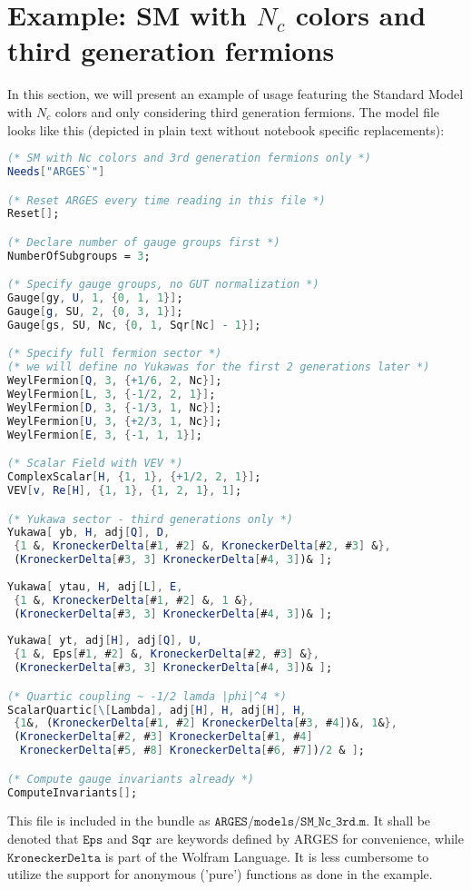 \documentclass{scrartcl}
\begin{document}
\section{Example: SM with $N_c$ colors and third generation fermions}
In this section, we will present an example of usage featuring the Standard Model with $N_c$ colors and only considering third generation fermions. The model file looks like this (depicted in plain text without notebook specific replacements):
\begin{lstlisting}[language=mathematica,mathescape,columns=flexible,backgroundcolor=\color{light-gray}]
(* SM with Nc colors and 3rd generation fermions only *)
Needs["ARGES`"]

(* Reset ARGES every time reading in this file *)
Reset[];

(* Declare number of gauge groups first *)
NumberOfSubgroups = 3;

(* Specify gauge groups, no GUT normalization *)
Gauge[gy, U, 1, {0, 1, 1}];
Gauge[g, SU, 2, {0, 3, 1}];
Gauge[gs, SU, Nc, {0, 1, Sqr[Nc] - 1}];

(* Specify full fermion sector *)
(* we will define no Yukawas for the first 2 generations later *)
WeylFermion[Q, 3, {+1/6, 2, Nc}];
WeylFermion[L, 3, {-1/2, 2, 1}];
WeylFermion[D, 3, {-1/3, 1, Nc}];
WeylFermion[U, 3, {+2/3, 1, Nc}];
WeylFermion[E, 3, {-1, 1, 1}];

(* Scalar Field with VEV *)
ComplexScalar[H, {1, 1}, {+1/2, 2, 1}];
VEV[v, Re[H], {1, 1}, {1, 2, 1}, 1];

(* Yukawa sector - third generations only *)
Yukawa[ yb, H, adj[Q], D, 
 {1 &, KroneckerDelta[#1, #2] &, KroneckerDelta[#2, #3] &}, 
 (KroneckerDelta[#3, 3] KroneckerDelta[#4, 3])& ];
 
Yukawa[ ytau, H, adj[L], E, 
 {1 &, KroneckerDelta[#1, #2] &, 1 &}, 
 (KroneckerDelta[#3, 3] KroneckerDelta[#4, 3])& ];
 
Yukawa[ yt, adj[H], adj[Q], U, 
 {1 &, Eps[#1, #2] &, KroneckerDelta[#2, #3] &},
 (KroneckerDelta[#3, 3] KroneckerDelta[#4, 3])& ];

(* Quartic coupling ~ -1/2 lamda |phi|^4 *)
ScalarQuartic[\[Lambda], adj[H], H, adj[H], H, 
 {1&, (KroneckerDelta[#1, #2] KroneckerDelta[#3, #4])&, 1&}, 
 (KroneckerDelta[#2, #3] KroneckerDelta[#1, #4] 
  KroneckerDelta[#5, #8] KroneckerDelta[#6, #7])/2 & ];

(* Compute gauge invariants already *)
ComputeInvariants[];
\end{lstlisting}
This file is included in the bundle as $\mathtt{ARGES/models/SM\_Nc\_3rd.m}$. It shall be denoted that $\mathtt{Eps}$ and $\mathtt{Sqr}$ are keywords defined by ARGES for convenience, while $\mathtt{KroneckerDelta}$ is part of the Wolfram Language. It is less cumbersome to utilize the support for anonymous ('pure') functions as done in the example.
\end{document}
